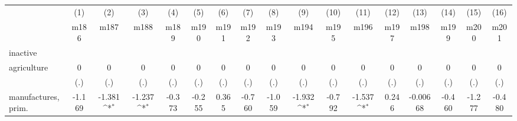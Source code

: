 {
\def\sym#1{\ifmmode^{#1}\else\(^{#1}\)\fi}
\begin{tabular}{l*{16}{c}}
\hline\hline
                    &\multicolumn{1}{c}{(1)}&\multicolumn{1}{c}{(2)}&\multicolumn{1}{c}{(3)}&\multicolumn{1}{c}{(4)}&\multicolumn{1}{c}{(5)}&\multicolumn{1}{c}{(6)}&\multicolumn{1}{c}{(7)}&\multicolumn{1}{c}{(8)}&\multicolumn{1}{c}{(9)}&\multicolumn{1}{c}{(10)}&\multicolumn{1}{c}{(11)}&\multicolumn{1}{c}{(12)}&\multicolumn{1}{c}{(13)}&\multicolumn{1}{c}{(14)}&\multicolumn{1}{c}{(15)}&\multicolumn{1}{c}{(16)}\\
                    &\multicolumn{1}{c}{m186}&\multicolumn{1}{c}{m187}&\multicolumn{1}{c}{m188}&\multicolumn{1}{c}{m189}&\multicolumn{1}{c}{m190}&\multicolumn{1}{c}{m191}&\multicolumn{1}{c}{m192}&\multicolumn{1}{c}{m193}&\multicolumn{1}{c}{m194}&\multicolumn{1}{c}{m195}&\multicolumn{1}{c}{m196}&\multicolumn{1}{c}{m197}&\multicolumn{1}{c}{m198}&\multicolumn{1}{c}{m199}&\multicolumn{1}{c}{m200}&\multicolumn{1}{c}{m201}\\
\hline
inactive            &                     &                     &                     &                     &                     &                     &                     &                     &                     &                     &                     &                     &                     &                     &                     &                     \\
agriculture         &           0         &           0         &           0         &           0         &           0         &           0         &           0         &           0         &           0         &           0         &           0         &           0         &           0         &           0         &           0         &           0         \\
                    &         (.)         &         (.)         &         (.)         &         (.)         &         (.)         &         (.)         &         (.)         &         (.)         &         (.)         &         (.)         &         (.)         &         (.)         &         (.)         &         (.)         &         (.)         &         (.)         \\
[1em]
manufactures, prim. &      -1.169         &      -1.381\sym{*}  &      -1.237\sym{*}  &      -0.373         &      -0.255         &       0.365         &      -0.760         &      -1.059         &      -1.932\sym{*}  &      -0.792         &      -1.537\sym{*}  &       0.246         &    -0.00668         &      -0.460         &      -1.277         &      -0.480         \\

\end{tabular}}
